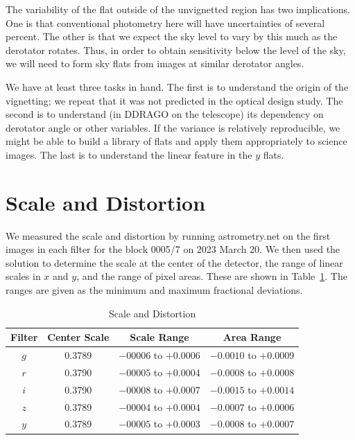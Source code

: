\documentclass{article}
\begin{document}
The variability of the flat outside of the unvignetted region has two implications. One is that conventional photometry here will have uncertainties of several percent. The other is that we expect the sky level to vary by this much as the derotator rotates. Thus, in order to obtain sensitivity below the level of the sky, we will need to form sky flats from images at similar derotator angles.

We have at least three tasks in hand. The first is to understand the origin of the vignetting; we repeat that it was not predicted in the optical design study. The second is to understand (in DDRAGO on the telescope) its dependency on derotator angle or other variables. If the variance is relatively reproducible, we might be able to build a library of flats and apply them appropriately to science images. The last is to understand the linear feature in the $y$ flats.

\clearpage
\section{Scale and Distortion}

We measured the scale and distortion by running astrometry.net on the first images in each filter for the block 0005/7 on 2023 March 20. We then used the solution to determine the scale at the center of the detector, the range of linear scales in $x$ and $y$, and the range of pixel areas. These are shown in Table~\ref{table:scale}. The ranges are given as the minimum and maximum fractional deviations.

\begin{table}[pb]
\begin{center}
\caption{Scale and Distortion}
\label{table:scale}
\begin{tabular}{cccc}
\hline
Filter&Center Scale&Scale Range&Area Range\\
\hline
$g$ & 0.3789 & $-00006$ to $+0.0006$ & $-0.0010$ to $+0.0009$ \\
$r$ & 0.3790 & $-00005$ to $+0.0004$ & $-0.0008$ to $+0.0008$ \\
$i$ & 0.3790 & $-00008$ to $+0.0007$ & $-0.0015$ to $+0.0014$ \\
$z$ & 0.3789 & $-00004$ to $+0.0004$ & $-0.0007$ to $+0.0006$ \\
$y$ & 0.3789 & $-00005$ to $+0.0003$ & $-0.0008$ to $+0.0007$ \\
\hline
\end{tabular}
\end{center}
\end{table}
\end{document}

